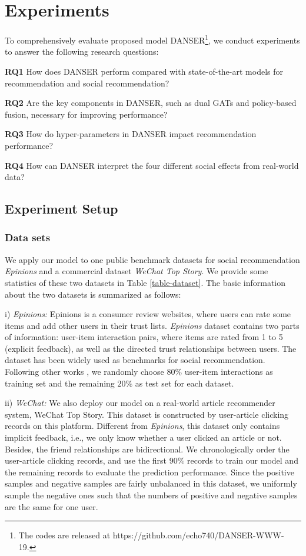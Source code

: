 \documentclass[sigconf]{acmart}
\begin{document}
\section{Experiments}

To comprehensively evaluate proposed model DANSER\footnote{The codes are released at https://github.com/echo740/DANSER-WWW-19.}, we conduct experiments to answer the following research questions:

\noindent\textbf{RQ1} How does DANSER perform compared with state-of-the-art models for recommendation and social recommendation?

\noindent\textbf{RQ2} Are the key components in DANSER, such as dual GATs and policy-based fusion, necessary for improving performance?

\noindent\textbf{RQ3} How do hyper-parameters in DANSER impact recommendation performance?

\noindent\textbf{RQ4} How can DANSER interpret {the} four different social effects from real-world data?

\subsection{Experiment Setup}
\subsubsection{Data sets} We apply our model to one public benchmark datasets for social recommendation \emph{Epinions} and a commercial dataset \emph{WeChat Top Story}. 
We provide some statistics of these two datasets in Table \ref{table-dataset}. 
The basic information about the two datasets is summarized as follows:

i) \emph{Epinions:} Epinions is a consumer review websites, where users can rate some items and add other users in their trust lists. \emph{Epinions} dataset \cite{epinion} contains two parts of information: user-item interaction pairs, where items are rated from 1 to 5 (explicit feedback), as well as the directed trust relationships between users. The dataset has been widely used as benchmarks for social recommendation. Following other works \cite{TrustSVD,TrustMF,NSCR,SREPS}, we randomly choose $80\%$ user-item interactions as training set and the remaining $20\%$ as test set for each dataset.

ii) \emph{WeChat:} 
We also deploy our model on a real-world article recommender system, WeChat Top Story. This dataset is constructed by user-article clicking records on this platform. Different from \emph{Epinions}, this dataset only contains implicit feedback, i.e., we only know whether a user clicked an article or not. Besides, the friend relationships are bidirectional. We chronologically order the user-article clicking records, and use the first $90\%$ records to train our model and the remaining records to evaluate the prediction performance. Since the positive samples and negative samples are fairly unbalanced in this dataset, we uniformly sample the negative ones such that the numbers of positive and negative samples are the same for one user.
\end{document}
